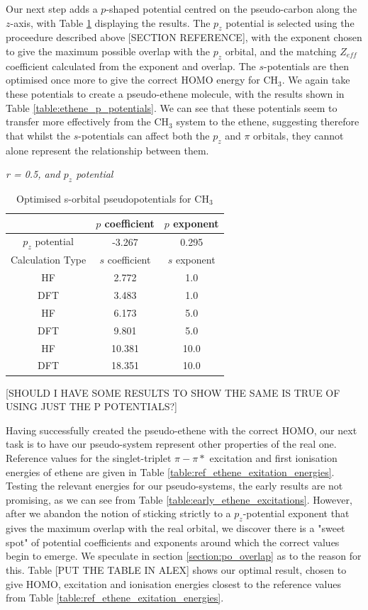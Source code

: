 \documentclass[journal=jctcce,manuscript=article]{achemso}
\begin{document}
Our next step adds a \(p\)-shaped potential centred on the pseudo-carbon along the \(z\)-axis, with Table \ref{table:ch3_p_potentials} displaying the results. The \(p_{z}\) potential is selected using the proceedure described above [SECTION REFERENCE], with the exponent chosen to give the maximum possible overlap with the \(p_{z}\) orbital, and the matching \(Z_{eff}\) coefficient calculated from the exponent and overlap. The \(s\)-potentials are then optimised once more to give the correct HOMO energy for CH\(_{3}\). We again take these potentials to create a pseudo-ethene molecule, with the results shown in Table \ref{table:ethene_p_potentials}. We can see that these potentials seem to transfer more effectively from the CH\(_{3}\) system to the ethene, suggesting therefore that whilst the \(s\)-potentials can affect both the \(p_{z}\) and \(\pi\) orbitals, they cannot alone represent the relationship between them.

\begin{table}[ht]
\caption{Optimised s-orbital pseudopotentials for CH\(_{3}\)}
\textit{r = 0.5, and \(p_{z}\) potential}
\begin{tabular}{c c c}
\hline\hline
& \(p\) coefficient & \(p\) exponent \\
\hline
\(p_{z}\) potential & -3.267 & 0.295 \\
\hline
Calculation Type & \(s\) coefficient & \(s\) exponent \\
\hline
HF & 2.772 & 1.0 \\
DFT & 3.483 & 1.0 \\
HF & 6.173 & 5.0 \\
DFT & 9.801 & 5.0 \\
HF & 10.381 & 10.0 \\
DFT & 18.351 & 10.0 \\
\hline
\end{tabular}
\label{table:ch3_p_potentials}
\end{table}

[SHOULD I HAVE SOME RESULTS TO SHOW THE SAME IS TRUE OF USING JUST THE P POTENTIALS?]

Having successfully created the pseudo-ethene with the correct HOMO, our next task is to have our pseudo-system represent other properties of the real one. Reference values for the singlet-triplet \(\pi-\pi*\) excitation and first ionisation energies of ethene are given in Table \ref{table:ref_ethene_exitation_energies}. Testing the relevant energies for our pseudo-systems, the early results are not promising, as we can see from Table \ref{table:early_ethene_excitations}. However, after we abandon the notion of sticking strictly to a \(p_{z}\)-potential exponent that gives the maximum overlap with the real orbital, we discover there is a "sweet spot" of potential coefficients and exponents around which the correct values begin to emerge. We speculate in section \ref{section:po_overlap} as to the reason for this. Table [PUT THE TABLE IN ALEX] shows our optimal result, chosen to give HOMO, excitation and ionisation energies closest to the reference values from Table \ref{table:ref_ethene_exitation_energies}. 
\end{document}
